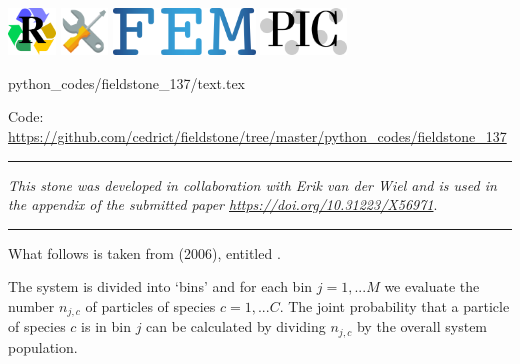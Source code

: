 \includegraphics[height=1.25cm]{images/pictograms/replication}
\includegraphics[height=1.25cm]{images/pictograms/tools}
\includegraphics[height=1.25cm]{images/pictograms/FEM}
\includegraphics[height=1.25cm]{images/pictograms/pic}


\begin{flushright} {\tiny {\color{gray} python\_codes/fieldstone\_137/text.tex}} \end{flushright}

%

\begin{center}
\inpython
Code: \url{https://github.com/cedrict/fieldstone/tree/master/python_codes/fieldstone_137}
\end{center}

\par\noindent\rule{\textwidth}{0.4pt}

{\sl This stone was developed in collaboration with Erik van der Wiel and is used in the 
appendix of the submitted paper \url{https://doi.org/10.31223/X56971}}. 

\par\noindent\rule{\textwidth}{0.4pt}

What follows is taken from \textcite{cakm06} (2006), entitled . 

The system is divided into `bins' and for each bin $j=1,...M$ we evaluate 
the number $n_{j,c}$ of particles of species $c=1,...C$.
The joint probability that a particle of species $c$
is in bin $j$ can be calculated by dividing $n_{j,c}$ by the overall system population.

